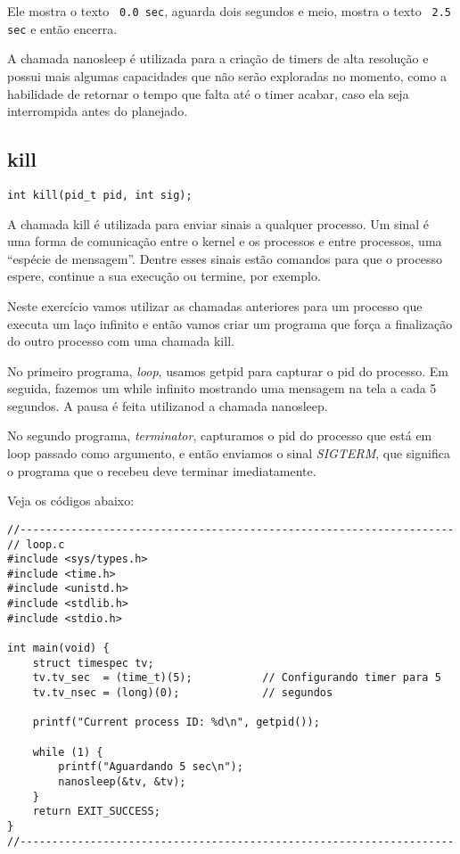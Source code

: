 Ele mostra o texto \texttt{ 0.0 sec}, aguarda dois segundos e meio, mostra o texto \texttt{ 2.5 sec} e então encerra.

A chamada nanosleep é utilizada para a criação de timers de alta resolução e possui mais algumas capacidades que não serão exploradas no momento, como a habilidade de retornar o tempo que falta até o timer acabar, caso ela seja interrompida antes do planejado.

\subsection{kill}

\begin{verbatim}
int kill(pid_t pid, int sig);
\end{verbatim}

A chamada kill é utilizada para enviar sinais a qualquer processo\cite{Man}. Um sinal é uma forma de comunicação entre o kernel e os processos e entre processos, uma ``espécie de mensagem''. Dentre esses sinais estão comandos para que o processo espere, continue a sua execução ou termine, por exemplo.

Neste exercício vamos utilizar as chamadas anteriores para um processo que executa um laço infinito e então vamos criar um programa que força a finalização do outro processo com uma chamada kill.

No primeiro programa, \emph{loop}, usamos getpid para capturar o pid do processo. Em seguida, fazemos um while infinito mostrando uma mensagem na tela a cada 5 segundos. A pausa é feita utilizanod a chamada nanosleep.

No segundo programa, \emph{terminator}, capturamos o pid do processo que está em loop passado como argumento, e então enviamos o sinal \emph{SIGTERM}, que significa o programa que o recebeu deve terminar imediatamente.

Veja os códigos abaixo:

\begin{espacosimples}
\begin{verbatim}
//--------------------------------------------------------------------
// loop.c
#include <sys/types.h>
#include <time.h>
#include <unistd.h>
#include <stdlib.h>
#include <stdio.h>

int main(void) {
    struct timespec tv;
    tv.tv_sec  = (time_t)(5);           // Configurando timer para 5
    tv.tv_nsec = (long)(0);             // segundos
    
    printf("Current process ID: %d\n", getpid());
    
    while (1) {
        printf("Aguardando 5 sec\n");
        nanosleep(&tv, &tv);
    }
    return EXIT_SUCCESS;
}
//--------------------------------------------------------------------
\end{verbatim}
\end{espacosimples}

